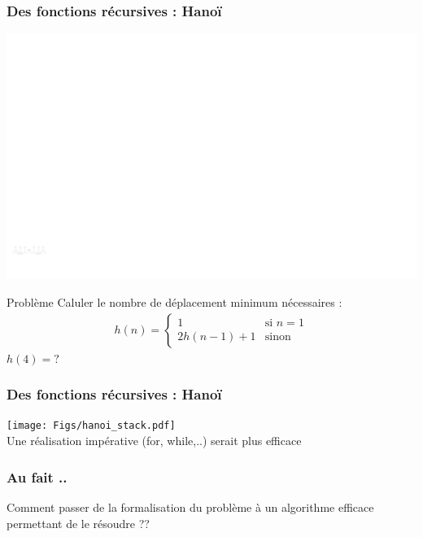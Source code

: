\documentclass{beamer}
\begin{document}
\begin{frame}
\frametitle{Des fonctions récursives : Hanoï}

\includegraphics[width=\linewidth]{Figs/hanoi.pdf}

\begin{block}{Problème}
Caluler le nombre de déplacement minimum nécessaires :
\begin{eqnarray*}
h(n) = \begin{cases}
1 & \mbox{si } n=1 \\
2h(n-1) + 1 & \mbox{sinon}
\end{cases}
\end{eqnarray*}
$h(4) = ?$
\end{block}
\end{frame}

\begin{frame}
\frametitle{Des fonctions récursives : Hanoï}
\texttt{[image: Figs/hanoi\_stack.pdf]}\\
Une réalisation impérative (for, while,..) serait plus efficace
\end{frame}



\begin{frame}
\frametitle{Au fait ..}

Comment passer de la formalisation du problème à un algorithme efficace permettant de le résoudre ??
\vfill
{}\\
\\
\end{frame}
\end{document}
